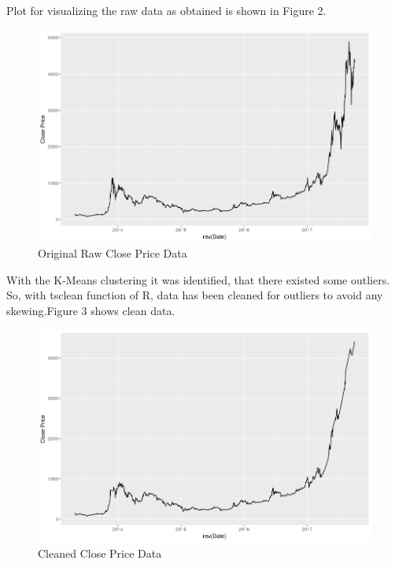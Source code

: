 \documentclass{article}
\begin{document}
Plot for visualizing the raw data as obtained is shown in Figure 2.


\begin{figure}[ht]
	\centering
	\includegraphics[scale=0.30]{images/ts_images/RawClosePricePlot.png}
	\caption{Original Raw Close Price Data}
	\label{fig:Original Raw Close Price Data}
\end{figure}

With the K-Means clustering it was identified, that there existed some outliers.
So, with tsclean function of R, data has been cleaned for outliers to avoid any skewing.\linebreak Figure 3 shows clean data.

\begin{figure}[ht]
	\centering
	\includegraphics[scale=0.30]{images/ts_images/CleanedClosePricePlot.png}
	\caption{Cleaned Close Price Data}
	\label{fig:Cleaned Close Price Data}
\end{figure}
\end{document}
